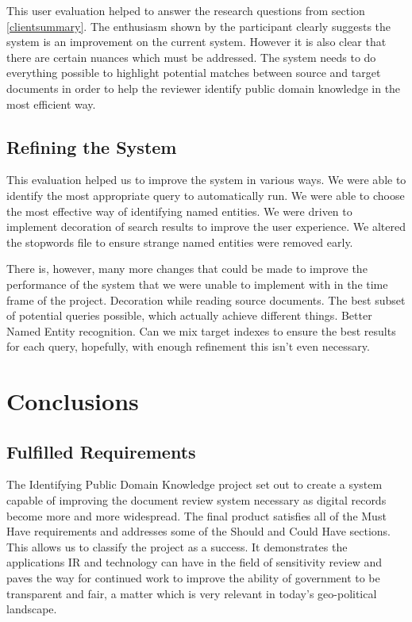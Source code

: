 \documentclass{l4proj}
\begin{document}
This user evaluation helped to answer the research questions from section \ref{clientsummary}. The enthusiasm shown by the participant clearly suggests the system is an improvement on the current system. However it is also clear that there are certain nuances which must be addressed.
The system needs to do everything possible to highlight potential matches between source and target documents in order to help the reviewer identify public domain knowledge in the most efficient way.

\section{Refining the System}
This evaluation helped us to improve the system in various ways.
We were able to identify the most appropriate query to automatically run. We were able to choose the most effective way of identifying named entities.
We were driven to implement decoration of search results to improve the user experience.
We altered the stopwords file to ensure strange named entities were removed early.

There is, however, many more changes that could be made to improve the performance of the system that we were unable to implement with in the time frame of the project.
Decoration while reading source documents. The best subset of potential queries possible, which actually achieve different things.
Better Named Entity recognition.
Can we mix target indexes to ensure the best results for each query, hopefully, with enough refinement this isn't even necessary.

\chapter{Conclusions} \label{conclusion}
\section{Fulfilled Requirements}
The Identifying Public Domain Knowledge project set out to create a system capable of improving the document review system necessary as digital records become more and more widespread.
The final product satisfies all of the Must Have requirements and addresses some of the Should and Could Have sections. This allows us to classify the project as a success.
It demonstrates the applications IR and technology can have in the field of sensitivity review and paves the way for continued work to improve the ability of government to be transparent and fair, a matter which is very relevant in today's geo-political landscape.
\end{document}

